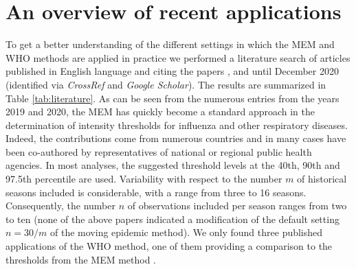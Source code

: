 \documentclass{article}
\begin{document}

\section{An overview of recent applications}
\label{sec:recent_applications}

To get a better understanding of the different settings in which the MEM and WHO methods are applied in practice we performed a literature search of articles published in English language and citing the papers \cite{Vega2015}, \cite{WHO2014} and \cite{WHO2017} until December 2020 (identified via \textit{CrossRef} and \textit{Google Scholar}). The results are summarized in Table \ref{tab:literature}. As can be seen from the numerous entries from the years 2019 and 2020, the MEM has quickly become a standard approach in the determination of intensity thresholds for influenza and other respiratory diseases. Indeed, the contributions come from numerous countries and in many cases have been co-authored by representatives of national or regional public health agencies. In most analyses, the suggested threshold levels at the 40th, 90th and 97.5th percentile are used. Variability with respect to the number $m$ of historical seasons included is considerable, with a range from three to 16 seasons. Consequently, the number $n$ of observations included per season ranges from two to ten (none of the above papers indicated a modification of the default setting $n = 30/m$ of the moving epidemic method). We only found three published applications of the WHO method, one of them providing a comparison to the thresholds from the MEM method \citep{Rguig2020}.
\end{document}
